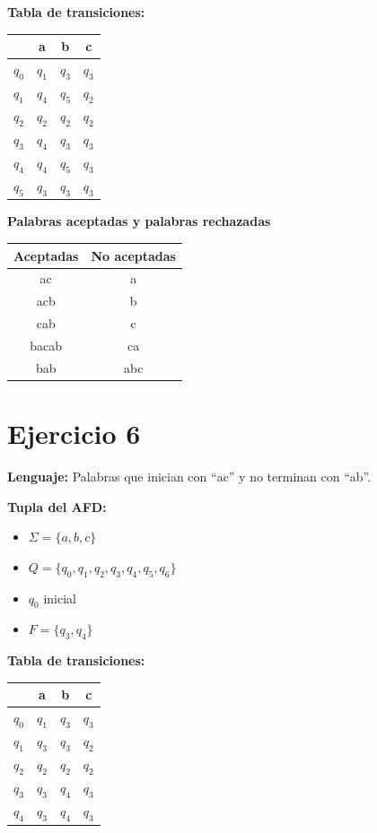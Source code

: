 \documentclass{article}
\begin{document}
\textbf{Tabla de transiciones:}
\begin{center}
\begin{tabular}{|c|c|c|c|}
\hline
 & a & b & c \\ \hline
$q_0$ & $q_1$ & $q_3$ & $q_3$ \\ \hline
$q_1$ & $q_4$ & $q_5$ & $q_2$ \\ \hline
$q_2$ & $q_2$ & $q_2$ & $q_2$ \\ \hline
$q_3$ & $q_4$ & $q_3$ & $q_3$ \\ \hline
$q_4$ & $q_4$ & $q_5$ & $q_3$ \\ \hline
$q_5$ & $q_3$ & $q_3$ & $q_3$ \\ \hline
\end{tabular}
\end{center}

\textbf{Palabras aceptadas y palabras rechazadas}
\begin{center}
\begin{tabular}{|c|c|}
\hline
Aceptadas & No aceptadas \\
\hline
ac & a \\
acb & b \\
cab & c \\
bacab & ca \\
bab & abc \\
\hline
\end{tabular}
\end{center}

\section*{Ejercicio 6}
\textbf{Lenguaje:} Palabras que inician con “ac” y no terminan con “ab”.  

\textbf{Tupla del AFD:}
\begin{itemize}
    \item $\Sigma = \{a,b,c\}$
    \item $Q = \{q_0,q_1,q_2,q_3,q_4,q_5,q_6\}$
    \item $q_0$ inicial
    \item $F = \{q_3,q_4\}$
\end{itemize}

\textbf{Tabla de transiciones:}
\begin{center}
\begin{tabular}{|c|c|c|c|}
\hline
 & a & b & c \\ \hline
$q_0$ & $q_1$ & $q_3$ & $q_3$ \\ \hline
$q_1$ & $q_3$ & $q_3$ & $q_2$ \\ \hline
$q_2$ & $q_2$ & $q_2$ & $q_2$ \\ \hline
$q_3$ & $q_3$ & $q_4$ & $q_3$ \\ \hline
$q_4$ & $q_3$ & $q_4$ & $q_3$ \\ \hline
\end{tabular}
\end{center}
\end{document}
